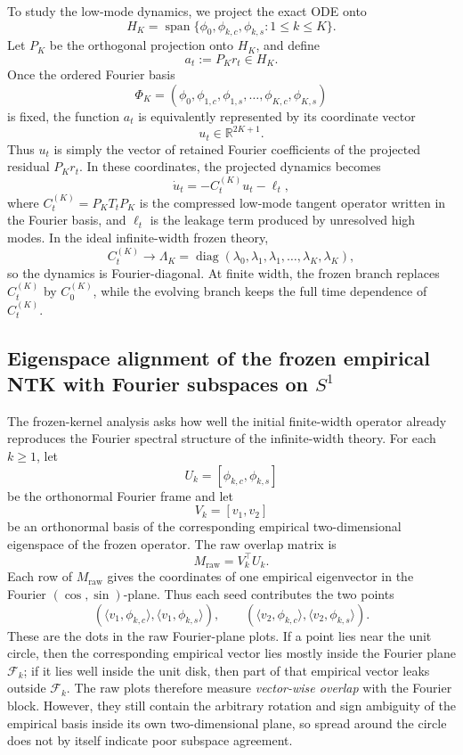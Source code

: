 \documentclass[11pt]{article}
\begin{document}
To study the low-mode dynamics, we project the exact ODE onto
\[
	H_K=\operatorname{span}\{\phi_0,\phi_{k,c},\phi_{k,s}:1\le k\le K\}.
\]
Let \(P_K\) be the orthogonal projection onto \(H_K\), and define
\[
	a_t:=P_K r_t\in H_K.
\]
Once the ordered Fourier basis
\[
	\Phi_K=(\phi_0,\phi_{1,c},\phi_{1,s},\dots,\phi_{K,c},\phi_{K,s})
\]
is fixed, the function \(a_t\) is equivalently represented by its coordinate vector
\[
	u_t\in\mathbb R^{2K+1}.
\]
Thus \(u_t\) is simply the vector of retained Fourier coefficients of the projected residual \(P_K r_t\). In these coordinates, the projected dynamics becomes
\[
	\dot u_t=-C_t^{(K)}u_t-\ell_t,
\]
where \(C_t^{(K)}=P_KT_tP_K\) is the compressed low-mode tangent operator written in the Fourier basis, and \(\ell_t\) is the leakage term produced by unresolved high modes. In the ideal infinite-width frozen theory,
\[
	C_t^{(K)}\to
	\Lambda_K=
	\operatorname{diag}(\lambda_0,\lambda_1,\lambda_1,\dots,\lambda_K,\lambda_K),
\]
so the dynamics is Fourier-diagonal. At finite width, the frozen branch replaces \(C_t^{(K)}\) by \(C_0^{(K)}\), while the evolving branch keeps the full time dependence of \(C_t^{(K)}\).

\subsection{Eigenspace alignment of the frozen empirical NTK with Fourier subspaces on \(S^1\)}
\label{subsec:frozen-ntk-eigenspace-alignment}

The frozen-kernel analysis asks how well the initial finite-width operator already reproduces the Fourier spectral structure of the infinite-width theory. For each \(k\ge 1\), let
\[
	U_k=[\phi_{k,c},\phi_{k,s}]
\]
be the orthonormal Fourier frame and let
\[
	V_k=[v_1,v_2]
\]
be an orthonormal basis of the corresponding empirical two-dimensional eigenspace of the frozen operator. The raw overlap matrix is
\[
	M_{\mathrm{raw}}=V_k^\top U_k.
\]
Each row of \(M_{\mathrm{raw}}\) gives the coordinates of one empirical eigenvector in the Fourier \((\cos,\sin)\)-plane. Thus each seed contributes the two points
\[
	(\langle v_1,\phi_{k,c}\rangle,\langle v_1,\phi_{k,s}\rangle),
	\qquad
	(\langle v_2,\phi_{k,c}\rangle,\langle v_2,\phi_{k,s}\rangle).
\]
These are the dots in the raw Fourier-plane plots. If a point lies near the unit circle, then the corresponding empirical vector lies mostly inside the Fourier plane \(\mathcal F_k\); if it lies well inside the unit disk, then part of that empirical vector leaks outside \(\mathcal F_k\). The raw plots therefore measure \emph{vector-wise overlap} with the Fourier block. However, they still contain the arbitrary rotation and sign ambiguity of the empirical basis inside its own two-dimensional plane, so spread around the circle does not by itself indicate poor subspace agreement.
\end{document}
